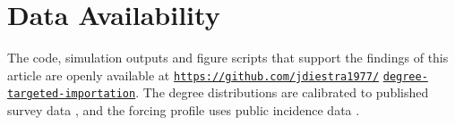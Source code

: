 \documentclass[pre,twocolumn,superscriptaddress,amsmath,amssymb,floatfix]{revtex4-2}
\begin{document}
\section*{Data Availability}
The code, simulation outputs and figure scripts that support the findings of
this article are openly available at
\href{https://github.com/jdiestra1977/degree-targeted-importation}{\mbox{\nolinkurl{https://github.com/jdiestra1977/}}}\hfil{}\hfilneg
\href{https://github.com/jdiestra1977/degree-targeted-importation}{\mbox{\nolinkurl{degree-targeted-importation}}}. The degree distributions are calibrated to published
survey data \cite{chandra2011sexual,copen2016sexual,liljeros2001web,brewer2000prostitution},
and the forcing profile uses public incidence data \cite{nycdohmh2022mpox}.


\end{document}
